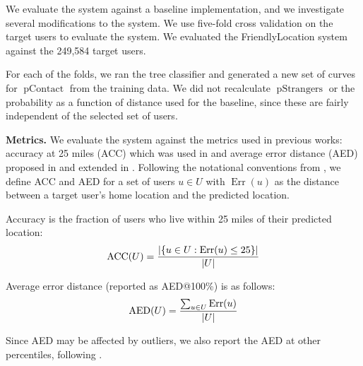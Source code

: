 \documentclass[letterpaper]{article}
\DeclareMathOperator{\pContact}{pContact}
\DeclareMathOperator{\pStrangers}{pStrangers}
\DeclareMathOperator{\Err}{Err}
\DeclareMathOperator{\AED}{AED}
\DeclareMathOperator{\ACC}{ACC}
\begin{document}
We evaluate the system against a baseline implementation, and we investigate
several modifications to the system.
%
We use five-fold cross validation on the target users to evaluate the system.
We evaluated the FriendlyLocation system against the 249,584 target users.

For each of the folds, we ran the tree classifier and generated a new set of
curves for $\pContact$ from the training data.
%
We did not recalculate $\pStrangers$ or the probability as a function of distance
used for the baseline, since these are fairly independent of the selected set
of users.

\medskip
\noindent\textbf{Metrics.} We evaluate the system against the metrics used in previous works:
accuracy at 25 miles (ACC) which was used in \cite{backstrom2010find}
and average error distance (AED) proposed in \cite{cheng2010you} and
extended in \cite{li2012towards}.
%
Following the notational conventions from \cite{li2012towards}, we define ACC
and AED for a set of users $u \in U$ with $\Err(u)$ as the distance between a
target user's home location and the predicted location.

Accuracy is the fraction of users who live within 25 miles of their predicted
location:
\[
    \ACC(U) = { |\{ u \in U : \Err(u)\le25 \}| \over |U| }
\]

Average error distance (reported as AED@100\%) is as follows:
\[
    \AED(U) = { \sum_{u \in U} \Err(u) \over |U| }
\]

Since AED may be affected by outliers, we also report the AED at other percentiles, following \cite{li2012towards}.

\end{document}
